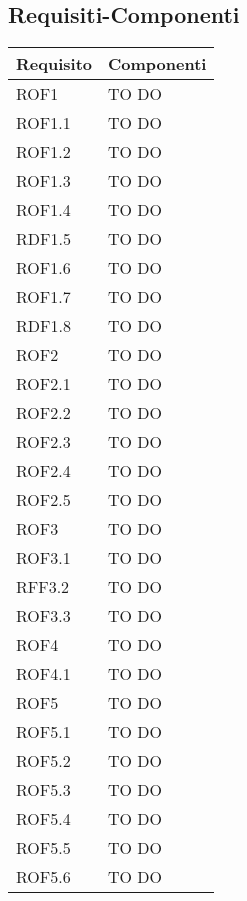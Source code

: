 \subsection{Requisiti-Componenti} %
\label{sub:componenti_requisiti}
\begin{center}
\def\arraystretch{1.5}
\bgroup
\begin{longtable}{| p{4cm} | p{8cm} |}
\hline
\textbf{Requisito} & \textbf{Componenti} \\
\hline


ROF1   &  TO DO \\
\hline
ROF1.1   &  TO DO \\
\hline
ROF1.2   &  TO DO \\
\hline
ROF1.3   &  TO DO \\
\hline
ROF1.4   &  TO DO \\
\hline
RDF1.5   &  TO DO \\
\hline
ROF1.6   &  TO DO \\
\hline
ROF1.7   &  TO DO \\
\hline
RDF1.8   &  TO DO \\
\hline

ROF2   &  TO DO \\
\hline
ROF2.1   &  TO DO \\
\hline
ROF2.2   &  TO DO \\
\hline
ROF2.3   &  TO DO \\
\hline
ROF2.4   &  TO DO \\
\hline
ROF2.5   &  TO DO \\
\hline

ROF3   &  TO DO \\
\hline
ROF3.1   &  TO DO \\
\hline
RFF3.2   &  TO DO \\
\hline
ROF3.3   &  TO DO \\
\hline

ROF4   &  TO DO \\
\hline
ROF4.1   &  TO DO \\
\hline

ROF5   &  TO DO \\
\hline
ROF5.1   &  TO DO \\
\hline
ROF5.2   &  TO DO \\
\hline
ROF5.3   &  TO DO \\
\hline
ROF5.4   &  TO DO \\
\hline
ROF5.5   &  TO DO \\
\hline
ROF5.6   &  TO DO \\
\hline


\end{longtable}
\end{center}
